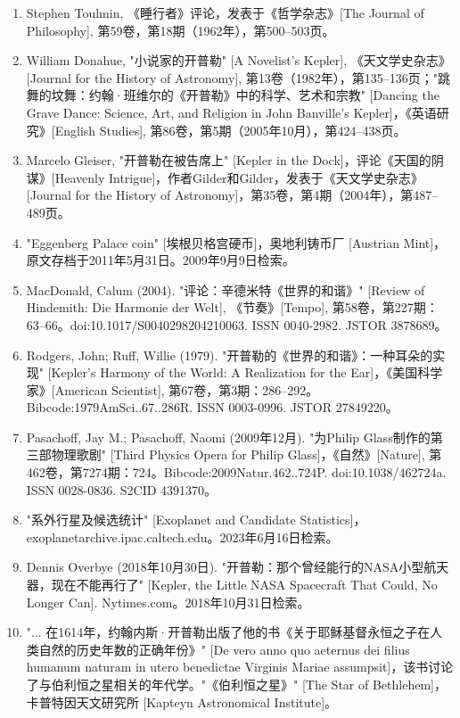 \begin{enumerate}
\item Stephen Toulmin, 《睡行者》评论，发表于《哲学杂志》[The Journal of Philosophy], 第59卷，第18期（1962年），第500–503页。
\item William Donahue, "小说家的开普勒" [A Novelist's Kepler], 《天文学史杂志》[Journal for the History of Astronomy], 第13卷（1982年），第135–136页；"跳舞的坟舞：约翰·班维尔的《开普勒》中的科学、艺术和宗教" [Dancing the Grave Dance: Science, Art, and Religion in John Banville's Kepler]，《英语研究》[English Studies], 第86卷，第5期（2005年10月），第424–438页。
\item Marcelo Gleiser, "开普勒在被告席上" [Kepler in the Dock]，评论《天国的阴谋》[Heavenly Intrigue]，作者Gilder和Gilder，发表于《天文学史杂志》[Journal for the History of Astronomy]，第35卷，第4期（2004年），第487–489页。
\item "Eggenberg Palace coin" [埃根贝格宫硬币]，奥地利铸币厂 [Austrian Mint]，原文存档于2011年5月31日。2009年9月9日检索。
\item MacDonald, Calum (2004). "评论：辛德米特《世界的和谐》" [Review of Hindemith: Die Harmonie der Welt], 《节奏》[Tempo], 第58卷，第227期：63–66。doi:10.1017/S0040298204210063. ISSN 0040-2982. JSTOR 3878689。
\item Rodgers, John; Ruff, Willie (1979). "开普勒的《世界的和谐》：一种耳朵的实现" [Kepler's Harmony of the World: A Realization for the Ear]，《美国科学家》[American Scientist], 第67卷，第3期：286–292。Bibcode:1979AmSci..67..286R. ISSN 0003-0996. JSTOR 27849220。
\item Pasachoff, Jay M.; Pasachoff, Naomi (2009年12月). "为Philip Glass制作的第三部物理歌剧" [Third Physics Opera for Philip Glass]，《自然》[Nature], 第462卷，第7274期：724。Bibcode:2009Natur.462..724P. doi:10.1038/462724a. ISSN 0028-0836. S2CID 4391370。
\item "系外行星及候选统计" [Exoplanet and Candidate Statistics]，exoplanetarchive.ipac.caltech.edu。2023年6月16日检索。
\item Dennis Overbye (2018年10月30日). "开普勒：那个曾经能行的NASA小型航天器，现在不能再行了" [Kepler, the Little NASA Spacecraft That Could, No Longer Can]. Nytimes.com。2018年10月31日检索。
\item "... 在1614年，约翰内斯·开普勒出版了他的书《关于耶稣基督永恒之子在人类自然的历史年数的正确年份》" [De vero anno quo aeternus dei filius humanum naturam in utero benedictae Virginis Mariae assumpsit]，该书讨论了与伯利恒之星相关的年代学。"《伯利恒之星》" [The Star of Bethlehem]，卡普特因天文研究所 [Kapteyn Astronomical Institute]。
\end{enumerate}
